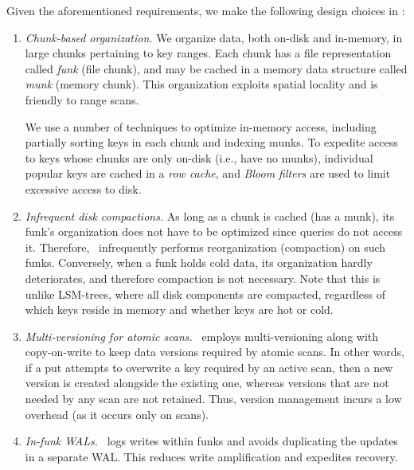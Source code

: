 
Given the aforementioned requirements, we make the following design choices in \sys:

\begin{enumerate}\itemsep0pt
\item \emph{Chunk-based organization.}
We organize data, both on-disk and in-memory,  in large chunks pertaining to  key ranges.  
Each chunk has a file representation called  \emph{funk} (file chunk), and may be cached in a  memory data structure called \emph{munk} (memory chunk).
This organization exploits spatial locality and is friendly to range scans.

We use a number of techniques to optimize in-memory  access, including partially sorting keys in each chunk and 
indexing munks. 
To expedite access to  keys whose chunks are only on-disk  (i.e., have no munks), 
individual popular keys are cached in a \emph{row cache}, 
and \emph{Bloom filters} are used to limit excessive access to disk. 

\item \emph{Infrequent disk compactions.}
As long as a chunk is cached (has a munk), its funk's organization does not have to be optimized since 
queries do not access it. Therefore, \sys\ infrequently performs reorganization (compaction) on such funks.
Conversely, when a funk holds cold data, its organization hardly deteriorates, and therefore compaction is not necessary.
Note that this is unlike LSM-trees, where all disk components are compacted, regardless of which keys reside in memory and whether 
keys are hot or cold. 

\item \emph{Multi-versioning for atomic scans.}
\sys\ employs multi-versioning along with
copy-on-write to keep data versions required by atomic scans. 
In other words, if a put attempts to overwrite a key  required by an active scan, then a new version is created alongside the 
existing one, whereas versions that are not needed by any scan are not retained. 
Thus, version management incurs a low overhead (as it occurs only on scans). 

\item \emph{In-funk WALs.}
\sys\ logs writes within funks and avoids duplicating the updates  in a separate WAL. This reduces write amplification and expedites recovery. 
\end{enumerate}
